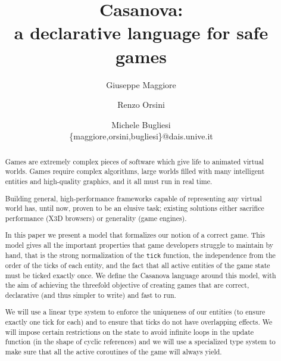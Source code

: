 \documentclass{article}
\begin{document}
\title{Casanova: \\ a declarative language for safe games}

\author{
Giuseppe Maggiore \and Renzo Orsini \and Michele Bugliesi \\
\{maggiore,orsini,bugliesi\}@dais.unive.it
}

\date{}

\maketitle

\begin{abstract}
Games are extremely complex pieces of software which give life to animated virtual worlds. Games require complex algorithms, large worlds filled with many intelligent entities and high-quality graphics, and it all must run in real time.

Building general, high-performance frameworks capable of representing any virtual world has, until now, proven to be an elusive task; existing solutions either sacrifice performance (X3D browsers) or generality (game engines).

In this paper we present a model that formalizes our notion of a correct game. This model gives all the important properties that game developers struggle to maintain by hand, that is the strong normalization of the \texttt{tick} function, the independence from the order of the ticks of each entity, and the fact that all active entities of the game state must be ticked exactly once. We define the Casanova language around this model, with the aim of achieving the threefold objective of creating games that are correct, declarative (and thus simpler to write) and fast to run.

We will use a linear type system to enforce the uniqueness of our entities (to ensure exactly one tick for each) and to ensure that ticks do not have overlapping effects. We will impose certain restrictions on the state to avoid infinite loops in the update function (in the shape of cyclic references) and we will use a specialized type system to make sure that all the active coroutines of the game will always yield.
\end{abstract}

\begin{comment}
\category{D.1.1}{Programming Techniques}{Applicative (Functional) Programming} 
\category{D.2.2}{Soft\-ware Engineering}{Software Libraries}[Design Tools and Techniques]
\category{D.2.13}{Soft\-ware Engineering}{Reusable Software}[Domain engineering, Reusable libraries, Reuse models]
\category{D.3.3}{Programming Languages}{Language Constructs and Features}
\category{D.3.4}{Pro\-gramming Languages}{Processors}[Optimization, Run-time environments]
\category{H.5.1}{Information Systems}{Information Interfaces and Presentation}[Multimedia Information Systems]

\terms{Games,Performance,Languages}

\keywords{games, compilation}
\end{comment}
\end{document}
